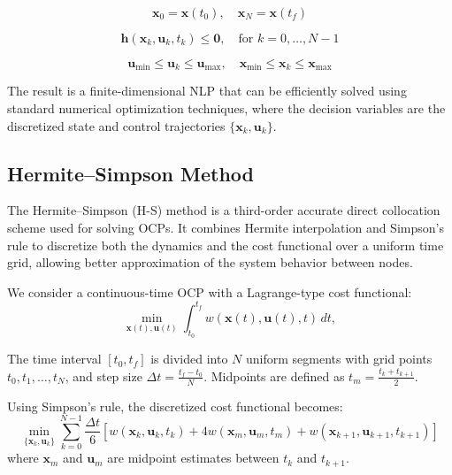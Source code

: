 \begin{equation}
\mathbf{x}_0 = \mathbf{x}(t_0), \quad \mathbf{x}_N = \mathbf{x}(t_f)
\tag*{\hfill Boundary Conditions}
\label{eq:boundary_conditions}
\end{equation}

\begin{equation}
\mathbf{h}(\mathbf{x}_k, \mathbf{u}_k, t_k) \leq \mathbf{0}, \quad \text{for } k = 0, \dots, N-1
\tag*{\hfill Path Constraints}
\label{eq:path_constraints}
\end{equation}

\begin{equation}
\mathbf{u}_{\min} \leq \mathbf{u}_k \leq \mathbf{u}_{\max}, \quad \mathbf{x}_{\min} \leq \mathbf{x}_k \leq \mathbf{x}_{\max}
\tag*{\hfill Control and State Bounds}
\label{eq:bounds}
\end{equation}

The result is a finite-dimensional NLP that can be efficiently solved using standard numerical optimization techniques, where the decision variables are the discretized state and control trajectories \( \{ \mathbf{x}_k, \mathbf{u}_k \} \).


\subsection{Hermite–Simpson Method}

The Hermite–Simpson (H-S) method is a third-order accurate direct collocation scheme used for solving OCPs. It combines Hermite interpolation and Simpson’s rule to discretize both the dynamics and the cost functional over a uniform time grid, allowing better approximation of the system behavior between nodes.

We consider a continuous-time OCP with a Lagrange-type cost functional:
\begin{equation}
\min_{\mathbf{x}(t), \mathbf{u}(t)} \int_{t_0}^{t_f} w(\mathbf{x}(t), \mathbf{u}(t), t) \, dt,
\tag*{\hfill Continuous Cost Functional}
\label{eq:hs_cont_cost}
\end{equation}

The time interval \( [t_0, t_f] \) is divided into \( N \) uniform segments with grid points \( t_0, t_1, \ldots, t_N \), and step size \( \Delta t = \frac{t_f - t_0}{N} \). Midpoints are defined as \( t_m = \frac{t_k + t_{k+1}}{2} \).

Using Simpson’s rule, the discretized cost functional becomes:
\begin{equation}
\min_{\{\mathbf{x}_k, \mathbf{u}_k\}} \sum_{k=0}^{N-1} \frac{\Delta t}{6} \left[ w(\mathbf{x}_k, \mathbf{u}_k, t_k) + 4 w(\mathbf{x}_m, \mathbf{u}_m, t_m) + w(\mathbf{x}_{k+1}, \mathbf{u}_{k+1}, t_{k+1}) \right]
\tag*{\hfill Discrete Cost Functional}
\label{eq:hs_disc_cost}
\end{equation}
where \( \mathbf{x}_m \) and \( \mathbf{u}_m \) are midpoint estimates between \( t_k \) and \( t_{k+1} \).

